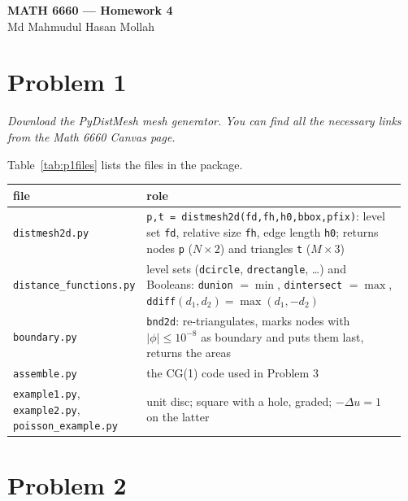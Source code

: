 \documentclass[11pt]{article}
\newcommand{\abs}[1]{\lvert #1\rvert}
\newcommand{\lap}{\Delta}
\newcommand{\problem}[2]{%
  \section*{Problem #1}%
  \renewcommand{\theequation}{#2.\arabic{equation}}%
  \setcounter{equation}{0}}
\begin{document}
\begin{center}
  {\large\bfseries MATH 6660 --- Homework 4}\\[2pt]
  {\small Md Mahmudul Hasan Mollah}
\end{center}



\problem{1}{1}

\textit{Download the PyDistMesh mesh generator.  You can find all the
necessary links from the Math 6660 Canvas page.}

Table~\ref{tab:p1files} lists the files in the package.
 

\begin{center}
\begin{minipage}{\linewidth}
\centering\footnotesize
\begin{tabular}{@{}>{\raggedright\arraybackslash}p{0.27\linewidth}>{\raggedright\arraybackslash}p{0.69\linewidth}@{}}
\toprule
file & role\\
\midrule
\texttt{distmesh2d.py} & \texttt{p,t = distmesh2d(fd,fh,h0,bbox,pfix)}: level set
  \texttt{fd}, relative size \texttt{fh}, edge length \texttt{h0}; returns
  nodes \texttt{p} ($N\times2$) and triangles \texttt{t} ($M\times3$)\\
\texttt{distance\_functions.py} & level sets (\texttt{dcircle},
  \texttt{drectangle}, \dots) and Booleans: \texttt{dunion} $=\min$,
  \texttt{dintersect} $=\max$, \texttt{ddiff}$(d_1,d_2)=\max(d_1,-d_2)$\\
\texttt{boundary.py} & \texttt{bnd2d}: re-triangulates, marks nodes with
  $\abs{\phi}\le10^{-8}$ as boundary and puts them last, returns the areas\\
\texttt{assemble.py} & the CG(1) code used in Problem 3\\
\texttt{example1.py}, \texttt{example2.py}, \texttt{poisson\_example.py} &
  unit disc; square with a hole, graded; $-\lap u=1$ on the latter\\
\bottomrule
\end{tabular}
\label{tab:p1files}
\end{minipage}
\end{center}

 


 \newpage

\problem{2}{2}
\end{document}
